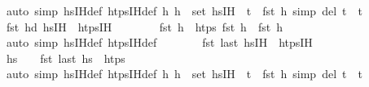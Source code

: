 \begin{isabellebody}
\ {\isacharparenleft}{\kern0pt}auto\ simp{\isacharcolon}{\kern0pt}\ hs{\isacharunderscore}{\kern0pt}IH{\isacharunderscore}{\kern0pt}def\ htps{\isacharunderscore}{\kern0pt}IH{\isacharunderscore}{\kern0pt}def\ {\isacartoucheopen}{\isasymAnd}h{\isacharprime}{\kern0pt}{\isachardot}{\kern0pt}\ h{\isacharprime}{\kern0pt}\ {\isasymin}\ set\ hs{\isacharunderscore}{\kern0pt}IH\ {\isasymLongrightarrow}\ t\ {\isasymnoteq}\ fst\ h{\isacharprime}{\kern0pt}{\isacartoucheclose}\ simp\ del{\isacharcolon}{\kern0pt}\ {\isacartoucheopen}t\ {\isacharequal}{\kern0pt}\ t{\isacharprime}{\kern0pt}{\isacartoucheclose}{\isacharparenright}{\kern0pt}\isanewline
\ \ \ \ \isamarkupfalse%
\ \isamarkupfalse%
\ {\isachardoublequoteopen}{\isacharparenleft}{\kern0pt}fst\ {\isacharparenleft}{\kern0pt}hd\ hs{\isacharprime}{\kern0pt}{\isacharunderscore}{\kern0pt}IH{\isacharparenright}{\kern0pt}{\isacharparenright}{\kern0pt}\ {\isasymin}\ htps{\isacharunderscore}{\kern0pt}IH{\isachardoublequoteclose}\isanewline
\ \ \ \ \ \ \isamarkupfalse%
\ {\isacartoucheopen}fst\ h{}\ {\isasymin}\ htps{\isacartoucheclose}\ {\isacartoucheopen}fst\ h{}\ {\isasymnoteq}\ fst\ h{\isacharprime}{\kern0pt}{\isacartoucheclose}\isanewline
\ \ \ \ \ \ \isamarkupfalse%
\ {\isacharparenleft}{\kern0pt}auto\ simp{\isacharcolon}{\kern0pt}\ hs{\isacharprime}{\kern0pt}{\isacharunderscore}{\kern0pt}IH{\isacharunderscore}{\kern0pt}def\ htps{\isacharunderscore}{\kern0pt}IH{\isacharunderscore}{\kern0pt}def{\isacharparenright}{\kern0pt}\isanewline
\ \ \ \ \isamarkupfalse%
\ \isamarkupfalse%
\ {\isachardoublequoteopen}{\isacharparenleft}{\kern0pt}fst\ {\isacharparenleft}{\kern0pt}last\ hs{\isacharunderscore}{\kern0pt}IH{\isacharparenright}{\kern0pt}{\isacharparenright}{\kern0pt}\ {\isasymin}\ htps{\isacharunderscore}{\kern0pt}IH{\isachardoublequoteclose}\isanewline
\ \ \ \ \ \ \isamarkupfalse%
\ {\isacartoucheopen}hs\ {\isasymnoteq}\ {\isacharbrackleft}{\kern0pt}{\isacharbrackright}{\kern0pt}\ {\isasymLongrightarrow}\ fst\ {\isacharparenleft}{\kern0pt}last\ hs{\isacharparenright}{\kern0pt}\ {\isasymin}\ htps{\isacartoucheclose}\isanewline
\ \ \ \ \ \ \isamarkupfalse%
\ {\isacharparenleft}{\kern0pt}auto\ simp{\isacharcolon}{\kern0pt}\ hs{\isacharunderscore}{\kern0pt}IH{\isacharunderscore}{\kern0pt}def\ htps{\isacharunderscore}{\kern0pt}IH{\isacharunderscore}{\kern0pt}def\ {\isacartoucheopen}{\isasymAnd}h{\isacharprime}{\kern0pt}{\isachardot}{\kern0pt}\ h{\isacharprime}{\kern0pt}\ {\isasymin}\ set\ hs{\isacharunderscore}{\kern0pt}IH\ {\isasymLongrightarrow}\ t\ {\isasymnoteq}\ fst\ h{\isacharprime}{\kern0pt}{\isacartoucheclose}\ simp\ del{\isacharcolon}{\kern0pt}\ {\isacartoucheopen}t\ {\isacharequal}{\kern0pt}\ t{\isacharprime}{\kern0pt}{\isacartoucheclose}{\isacharparenright}{\kern0pt}\isanewline

\end{isabellebody}
